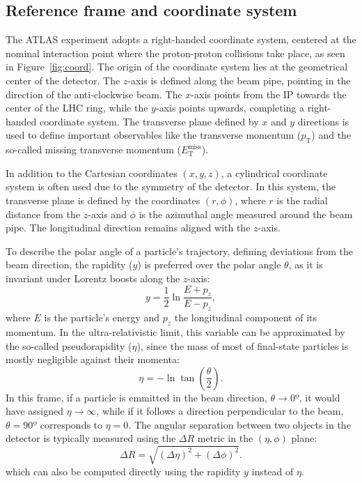 \subsection{Reference frame and coordinate system}
\label{sec:coordinates}

The ATLAS experiment adopts a right-handed coordinate system, centered at the nominal interaction point where the proton-proton collisions take place, as seen in Figure~\ref{fig:coord}. The origin of the coordinate system lies at the geometrical center of the detector. The $z$-axis is defined along the beam pipe, pointing in the direction of the anti-clockwise beam. The $x$-axis points from the IP towards the center of the LHC ring, while the $y$-axis points upwards, 
completing a right-handed coordinate system. The transverse plane defined by $x$ and $y$ directions is used to define important observables like the transverse momentum ($p_{\text{T}}$) and the so-called missing transverse momentum ($E^{\text{miss}}_{\text{T}}$).

In addition to the Cartesian coordinates $(x, y, z)$, a cylindrical coordinate system is often used due to the symmetry of the detector. In this system, the transverse plane is defined by the coordinates $(r, \phi)$, where $r$ is the radial distance from the $z$-axis and $\phi$ is the azimuthal angle measured around the beam pipe. The longitudinal direction remains aligned with the $z$-axis.

To describe the polar angle of a particle’s trajectory, defining deviations from the beam direction, the rapidity ($y$) is preferred over the polar angle $\theta$, as it is invariant under Lorentz boosts along the $z$-axis:
\begin{equation}
    y = \frac{1}{2}\ln{\frac{E+p_{z}}{E-{p_{z}}}},
\end{equation}
where $E$ is the particle's energy and $p_{z}$ the longitudinal component of its momentum. In the ultra-relativistic limit, this variable can be approximated by the so-called pseudorapidity ($\eta$), since the mass of most of final-state particles is mostly negligible against their momenta:
\begin{equation}
\eta = -\ln \tan \left( \frac{\theta}{2} \right).
\end{equation}
In this frame, if a particle is emmitted in the beam direction, $\theta \rightarrow 0º$, it would have assigned $\eta \rightarrow \infty$, while if it follows a direction perpendicular to the beam, $\theta = 90º$ corresponds to $\eta = 0$.
The angular separation between two objects in the detector is typically measured using the $\Delta R$ metric in the $(\eta, \phi)$ plane:
\begin{equation}
\Delta R = \sqrt{(\Delta \eta)^2 + (\Delta \phi)^2}.
\end{equation}
which can also be computed directly using the rapidity $y$ instead of $\eta$.

